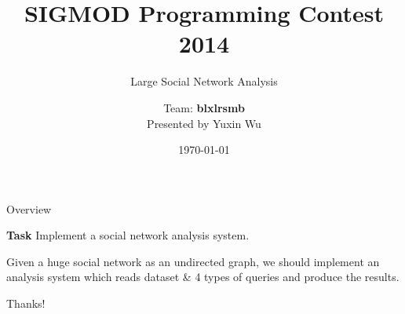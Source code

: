 \documentclass {beamer}
\title{SIGMOD Programming Contest 2014}
\subtitle{Large Social Network Analysis}
\author {Team: \textbf{blxlrsmb}\\ Presented by Yuxin Wu}
\institute{
  Department of Computer Science and Technology\\
  Tsinghua University\\
}
\date{\today}
\theoremstyle{plain}
\begin{document}
\frame[plain]{\titlepage}

\begin{frame}{Overview}
\begin{exampleblock}{\textbf{Task}}
Implement a social network analysis system.
\end{exampleblock}
Given a huge social network as an undirected graph,
we should implement an
analysis system which reads dataset \& 4 types of queries and
produce the results.
\end{frame}










\begin{frame}{}
  \begin{center}
  \Huge Thanks!
\end{center}
\end{frame}
\end{document}
